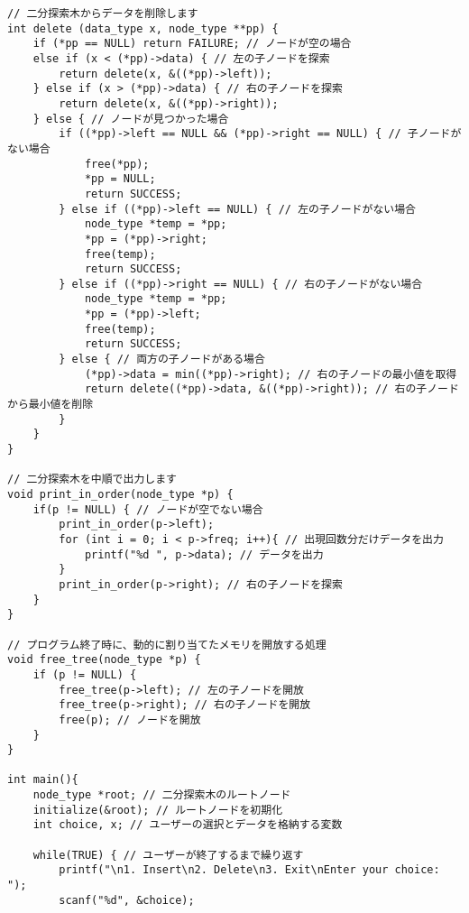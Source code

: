 \documentclass[]{jsarticle}
\begin{document}
\begin{lstlisting}[caption={binarySearchTree.c}]
// 二分探索木からデータを削除します
int delete (data_type x, node_type **pp) {
    if (*pp == NULL) return FAILURE; // ノードが空の場合
    else if (x < (*pp)->data) { // 左の子ノードを探索
        return delete(x, &((*pp)->left));
    } else if (x > (*pp)->data) { // 右の子ノードを探索
        return delete(x, &((*pp)->right));
    } else { // ノードが見つかった場合
        if ((*pp)->left == NULL && (*pp)->right == NULL) { // 子ノードがない場合
            free(*pp);
            *pp = NULL;
            return SUCCESS;
        } else if ((*pp)->left == NULL) { // 左の子ノードがない場合
            node_type *temp = *pp;
            *pp = (*pp)->right;
            free(temp);
            return SUCCESS;
        } else if ((*pp)->right == NULL) { // 右の子ノードがない場合
            node_type *temp = *pp;
            *pp = (*pp)->left;
            free(temp);
            return SUCCESS;
        } else { // 両方の子ノードがある場合
            (*pp)->data = min((*pp)->right); // 右の子ノードの最小値を取得
            return delete((*pp)->data, &((*pp)->right)); // 右の子ノードから最小値を削除
        }
    }
}

// 二分探索木を中順で出力します
void print_in_order(node_type *p) {
    if(p != NULL) { // ノードが空でない場合
        print_in_order(p->left);
        for (int i = 0; i < p->freq; i++){ // 出現回数分だけデータを出力
            printf("%d ", p->data); // データを出力
        }
        print_in_order(p->right); // 右の子ノードを探索
    }
}

// プログラム終了時に、動的に割り当てたメモリを開放する処理
void free_tree(node_type *p) {
    if (p != NULL) {
        free_tree(p->left); // 左の子ノードを開放
        free_tree(p->right); // 右の子ノードを開放
        free(p); // ノードを開放
    }
}

int main(){
    node_type *root; // 二分探索木のルートノード
    initialize(&root); // ルートノードを初期化
    int choice, x; // ユーザーの選択とデータを格納する変数

    while(TRUE) { // ユーザーが終了するまで繰り返す
        printf("\n1. Insert\n2. Delete\n3. Exit\nEnter your choice: "); 
        scanf("%d", &choice);


\end{lstlisting}
\end{document}
